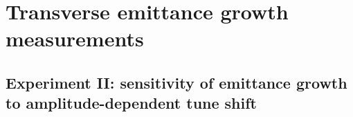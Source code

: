  \section{Transverse emittance growth measurements}\label{sec:emittance_growth_2022}




 \subsection{Experiment II: sensitivity of emittance growth to amplitude-dependent tune shift}\label{subsec:emittance_growth_2022_exper2}


